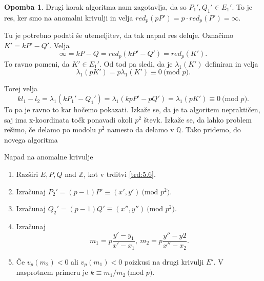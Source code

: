 \documentclass[12pt,a4paper,twoside]{article}
\theoremstyle{definition} %
\newtheorem{opomba}[definicija]{Opomba}
\theoremstyle{plain} %
\numberwithin{equation}{section}  %
\newcommand{\Z}{\mathbb Z}
\newcommand{\Q}{\mathbb Q}
\newcommand{\MOD}[1]{\ \text{(mod }{#1}\text{)}}
\begin{document}
\begin{opomba}
Drugi korak algoritma nam zagotavlja, da so $P_1',Q_1' \in E_1'$. To je res, ker smo na anomalni krivulji in velja $red_p(pP') = p\cdot red_p(P') = \infty$.
\end{opomba}

Tu je potrebno podati še utemeljitev, da tak napad res deluje. Označimo $K' = kP'-Q'$.
Velja
$$\infty = kP-Q = red_p(kP'-Q') = red_p(K').$$
To ravno pomeni, da $K' \in E_1'$. Od tod pa sledi, da je $\lambda_1(K')$ definiran in velja
$$\lambda_1(pK') = p \lambda_1(K') \equiv 0 \MOD{p}.$$

Torej velja
$$kl_1-l_2 = \lambda_1(kP_1'-Q_1') = \lambda_1(kpP'-pQ') = \lambda_1(pK') \equiv 0 \MOD{p}.$$
To pa je ravno to kar hočemo pokazati.
Izkaže se, da je ta algoritem nepraktičen, saj ima x-koordinata točk ponavadi okoli $p^2$ števk.
Izkaže se, da lahko problem rešimo, če delamo po modolu $p^2$ namesto da delamo v $\Q$.
Tako pridemo, do novega algoritma

\begin{algorithm}[H]
\caption[ANC]{Napad na anomalne krivulje}
\label{alg:AnomalAttack}
\begin{enumerate}
\item Razširi $E,P,Q$ nad $\Z$, kot v trditvi \ref{trd:5.6}.
\item Izračunaj $P_2' = (p-1)P' \equiv (x',y') \MOD{p^2}$.
\item Izračunaj $Q_2' = (p-1)Q' \equiv(x'',y'') \MOD{p^2}$.
\item Izračunaj
$$m_1 = p\frac{y'-y_1}{x'-x_1}, \ m_2 = p\frac{y''-y2}{x''-x_2}.$$
\item Če $v_p(m_2) <0$ ali $v_p(m_1)<0$ poizkusi na drugi krivulji $E'$. V nasprotnem primeru je $k \equiv m_1/m_2 \MOD{p}$.
\end{enumerate}

\end{algorithm}
\end{document}

